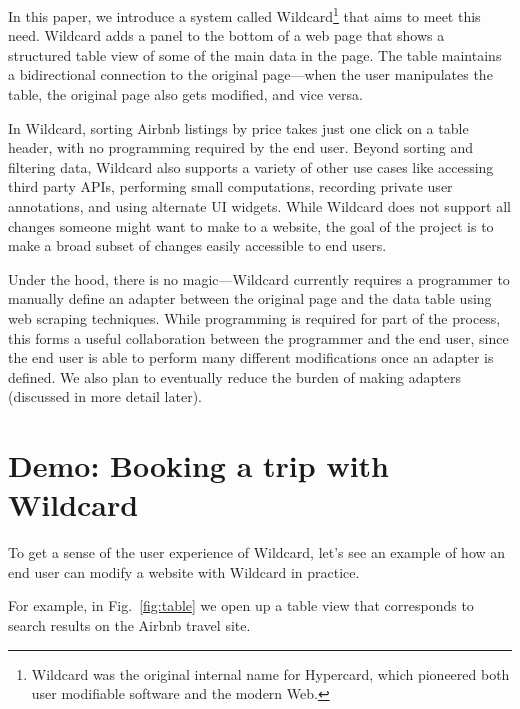 \documentclass[english,submission]{programming}
\begin{document}
In this paper, we introduce a system called Wildcard\footnote{Wildcard
  was the original internal name for Hypercard, which pioneered both
  user modifiable software and the modern Web.} that aims to meet this
need. Wildcard adds a panel to the bottom of a web page that shows a
structured table view of some of the main data in the page. The table
maintains a bidirectional connection to the original page---when the
user manipulates the table, the original page also gets modified, and
vice versa.

In Wildcard, sorting Airbnb listings by price takes just one click on a
table header, with no programming required by the end user. Beyond
sorting and filtering data, Wildcard also supports a variety of other
use cases like accessing third party APIs, performing small
computations, recording private user annotations, and using alternate UI
widgets. While Wildcard does not support all changes someone might want
to make to a website, the goal of the project is to make a broad subset
of changes easily accessible to end users.

Under the hood, there is no magic---Wildcard currently requires a
programmer to manually define an adapter between the original page and
the data table using web scraping techniques. While programming is
required for part of the process, this forms a useful collaboration
between the programmer and the end user, since the end user is able to
perform many different modifications once an adapter is defined. We also
plan to eventually reduce the burden of making adapters (discussed in
more detail later).

\hypertarget{demo-booking-a-trip-with-wildcard}{%
\section{Demo: Booking a trip with
Wildcard}\label{demo-booking-a-trip-with-wildcard}}

To get a sense of the user experience of Wildcard, let's see an example
of how an end user can modify a website with Wildcard in practice.

For example, in Fig.~\ref{fig:table} we open up a table view that
corresponds to search results on the Airbnb travel site.
\end{document}
